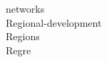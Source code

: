 \documentclass[a4paper]{article}
\begin{document}
\begin{multicols*}{2}
\begin{footnotesize}
 networks \\ Regional-development \\ Regions \\ Regre
\end{footnotesize}
\end{multicols*}
\end{document}
